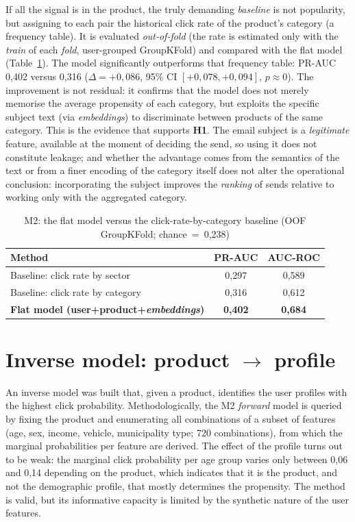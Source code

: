 If all the signal is in the product, the truly demanding \textit{baseline} is not popularity, but assigning to each pair the historical click rate of the product's category (a frequency table). It is evaluated \textit{out-of-fold} (the rate is estimated only with the \textit{train} of each \textit{fold}, user-grouped GroupKFold) and compared with the flat model (Table~\ref{tab:m2_ctr}). The model significantly outperforms that frequency table: PR-AUC 0,402 versus 0,316 ($\Delta=+0{,}086$, 95\% CI $[+0{,}078,+0{,}094]$, $p\approx0$). The improvement is not residual: it confirms that the model does not merely memorise the average propensity of each category, but exploits the specific subject text (via \textit{embeddings}) to discriminate between products of the same category. This is the evidence that supports \textbf{H1}. The email subject is a \emph{legitimate} feature, available at the moment of deciding the send, so using it does not constitute leakage; and whether the advantage comes from the semantics of the text or from a finer encoding of the category itself does not alter the operational conclusion: incorporating the subject improves the \textit{ranking} of sends relative to working only with the aggregated category.

\begin{table}[htbp]
\centering
\caption{M2: the flat model versus the click-rate-by-category baseline (OOF GroupKFold; chance~=~0,238)}
\label{tab:m2_ctr}
\begin{tabular}{lcc}
\toprule
\textbf{Method} & \textbf{PR-AUC} & \textbf{AUC-ROC} \\
\midrule
Baseline: click rate by sector        & 0,297 & 0,589 \\
Baseline: click rate by category      & 0,316 & 0,612 \\
\textbf{Flat model (user+product+\textit{embeddings})} & \textbf{0,402} & \textbf{0,684} \\
\bottomrule
\end{tabular}
\end{table}

\section{Inverse model: product \texorpdfstring{$\rightarrow$}{->} profile}

An inverse model was built that, given a product, identifies the user profiles with the highest click probability. Methodologically, the M2 \emph{forward} model is queried by fixing the product and enumerating all combinations of a subset of features (age, sex, income, vehicle, municipality type; 720 combinations), from which the marginal probabilities per feature are derived. The effect of the profile turns out to be weak: the marginal click probability per age group varies only between 0,06 and 0,14 depending on the product, which indicates that it is the product, and not the demographic profile, that mostly determines the propensity. The method is valid, but its informative capacity is limited by the synthetic nature of the user features.
